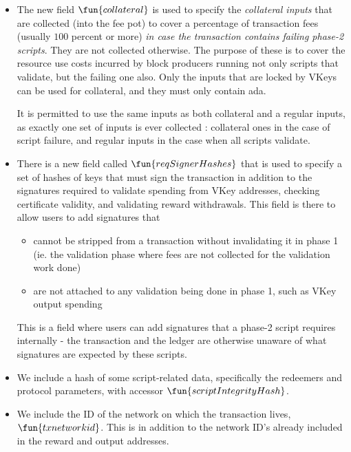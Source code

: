 \begin{itemize}
  \item The new field $\fun{collateral}$ is used to specify the \emph{collateral inputs}
    that are collected (into the fee pot) to cover a percentage of
    transaction fees (usually $100$ percent or more)
    \emph{in case the transaction contains failing phase-2 scripts}. They are not collected otherwise.
    The purpose of these is to cover the resource use costs incurred by block producers running not only
    scripts that validate, but the failing one also. Only the inputs that are locked by VKeys can
    be used for collateral, and they must only contain ada.

    It is permitted to use the same inputs as both collateral and a regular inputs, as exactly
    one set of inputs is ever collected : collateral ones in the case of script failure, and regular inputs
    in the case when all scripts validate.

  \item There is a new field called $\fun{reqSignerHashes}$ that is used to specify a set of hashes
  of keys that must sign the transaction in addition to the signatures required to validate
  spending from VKey addresses, checking certificate validity, and validating reward withdrawals.
  This field is there to allow users to add signatures that
  \begin{itemize}
    \item cannot be stripped from a transaction without invalidating it in phase 1 (ie. the
    validation phase where fees are not collected for the validation work done)
    \item are not attached to any validation being done in phase 1, such as VKey output spending
  \end{itemize}

  This is a field where users can add signatures that a phase-2 script requires internally -
  the transaction and the ledger are otherwise unaware of what signatures are expected by these scripts.

  \item We include a hash of some script-related data, specifically the redeemers and protocol parameters,
    with accessor $\fun{scriptIntegrityHash}$.

  \item We include the ID of the network on which the transaction lives, $\fun{txnetworkid}$.
  This is in addition to the network ID's already included in the reward and output addresses.
\end{itemize}

